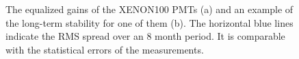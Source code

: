 \begin{figure}[!h]
\centering
{}
\caption[The equalized gains of the XENON100 PMTs and an example of the long-term stability]{The equalized gains of the XENON100 PMTs (a) and an example of the long-term stability for one of them (b). The horizontal blue lines indicate the RMS  spread over an 8 month period. It is comparable with the statistical errors of the measurements.}
\label{figGainDistribution}
\end{figure}








